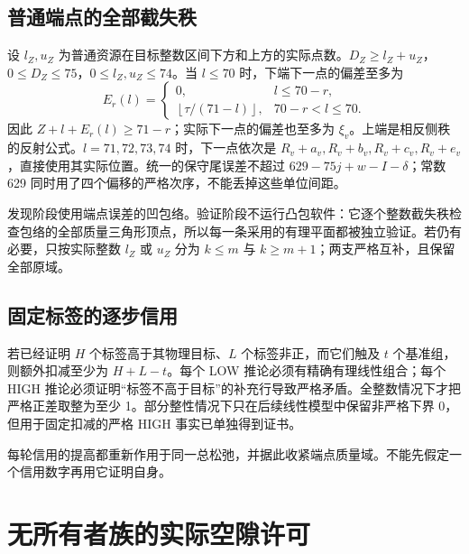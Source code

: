 \documentclass[11pt,a4paper]{article}
\begin{document}
\hypertarget{ux666eux901aux7aefux70b9ux7684ux5168ux90e8ux622aux5931ux79e9}{%
\subsection{普通端点的全部截失秩}\label{ux666eux901aux7aefux70b9ux7684ux5168ux90e8ux622aux5931ux79e9}}

设 \(l_Z,u_Z\)
为普通资源在目标整数区间下方和上方的实际点数。\(D_Z\ge l_Z+u_Z\)，\(0\le D_Z\le75\)，\(0\le l_Z,u_Z\le74\)。当
\(l\le70\) 时，下端下一点的偏差至多为 \[
 E_r(l)=\begin{cases}
 0,&l\le70-r,\\
 \left\lfloor\tau/(71-l)\right\rfloor,&70-r<l\le70.
 \end{cases}
\] 因此 \(Z+l+E_r(l)\ge71-r\)；实际下一点的偏差也至多为
\(\xi_v\)。上端是相反侧秩的反射公式。\(l=71,72,73,74\) 时，下一点依次是
\(R_v+a_v,R_v+b_v,R_v+c_v,R_v+e_v\)，直接使用其实际位置。统一的保守尾误差不超过
\(629-75j+w-I-\delta\)；常数 629
同时用了四个偏移的严格次序，不能丢掉这些单位间距。

发现阶段使用端点误差的凹包络。验证阶段不运行凸包软件：它逐个整数截失秩检查包络的全部质量三角形顶点，所以每一条采用的有理平面都被独立验证。若仍有必要，只按实际整数
\(l_Z\) 或 \(u_Z\) 分为 \(k\le m\) 与
\(k\ge m+1\)；两支严格互补，且保留全部原域。

\hypertarget{ux56faux5b9aux6807ux7b7eux7684ux9010ux6b65ux4fe1ux7528}{%
\subsection{固定标签的逐步信用}\label{ux56faux5b9aux6807ux7b7eux7684ux9010ux6b65ux4fe1ux7528}}

若已经证明 \(H\) 个标签高于其物理目标、\(L\) 个标签非正，而它们触及
\(t\) 个基准组，则额外扣减至少为 \(H+L-t\)。每个 LOW
推论必须有精确有理线性组合；每个 HIGH
推论必须证明``标签不高于目标''的补充行导致严格矛盾。全整数情况下才把严格正差取整为至少
1。部分整性情况下只在后续线性模型中保留非严格下界
0，但用于固定扣减的严格 HIGH 事实已单独得到证书。

每轮信用的提高都重新作用于同一总松弛，并据此收紧端点质量域。不能先假定一个信用数字再用它证明自身。

\hypertarget{ux65e0ux6240ux6709ux8005ux65cfux7684ux5b9eux9645ux7a7aux9699ux8bb8ux53ef}{%
\section{无所有者族的实际空隙许可}\label{ux65e0ux6240ux6709ux8005ux65cfux7684ux5b9eux9645ux7a7aux9699ux8bb8ux53ef}}
\end{document}
